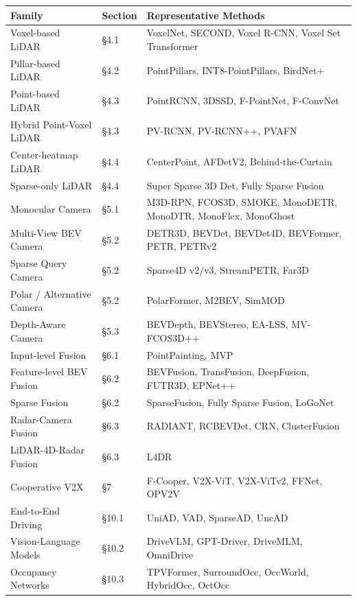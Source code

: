 {\def\LTcaptype{none} %
\begin{longtable}[]{@{}
  >{\raggedright\arraybackslash}p{}
  >{\raggedright\arraybackslash}p{}
  >{\raggedright\arraybackslash}p{}@{}}
\toprule\noalign{}
\begin{minipage}[b]{\linewidth}\raggedright
Family
\end{minipage} & \begin{minipage}[b]{\linewidth}\raggedright
Section
\end{minipage} & \begin{minipage}[b]{\linewidth}\raggedright
Representative Methods
\end{minipage} \\
\midrule\noalign{}
\endhead
\bottomrule\noalign{}
\endlastfoot
Voxel-based LiDAR & §4.1 & VoxelNet, SECOND, Voxel R-CNN, Voxel Set Transformer \\
Pillar-based LiDAR & §4.2 & PointPillars, INT8-PointPillars, BirdNet+ \\
Point-based LiDAR & §4.3 & PointRCNN, 3DSSD, F-PointNet, F-ConvNet \\
Hybrid Point-Voxel LiDAR & §4.3 & PV-RCNN, PV-RCNN++, PVAFN \\
Center-heatmap LiDAR & §4.4 & CenterPoint, AFDetV2, Behind-the-Curtain \\
Sparse-only LiDAR & §4.4 & Super Sparse 3D Det, Fully Sparse Fusion \\
Monocular Camera & §5.1 & M3D-RPN, FCOS3D, SMOKE, MonoDETR, MonoDTR, MonoFlex, MonoGhost \\
Multi-View BEV Camera & §5.2 & DETR3D, BEVDet, BEVDet4D, BEVFormer, PETR, PETRv2 \\
Sparse Query Camera & §5.2 & Sparse4D v2/v3, StreamPETR, Far3D \\
Polar / Alternative Camera & §5.2 & PolarFormer, M2BEV, SimMOD \\
Depth-Aware Camera & §5.3 & BEVDepth, BEVStereo, EA-LSS, MV-FCOS3D++ \\
Input-level Fusion & §6.1 & PointPainting, MVP \\
Feature-level BEV Fusion & §6.2 & BEVFusion, TransFusion, DeepFusion, FUTR3D, EPNet++ \\
Sparse Fusion & §6.2 & SparseFusion, Fully Sparse Fusion, LoGoNet \\
Radar-Camera Fusion & §6.3 & RADIANT, RCBEVDet, CRN, ClusterFusion \\
LiDAR-4D-Radar Fusion & §6.3 & L4DR \\
Cooperative V2X & §7 & F-Cooper, V2X-ViT, V2X-ViTv2, FFNet, OPV2V \\
End-to-End Driving & §10.1 & UniAD, VAD, SparseAD, UncAD \\
Vision-Language Models & §10.2 & DriveVLM, GPT-Driver, DriveMLM, OmniDrive \\
Occupancy Networks & §10.3 & TPVFormer, SurroundOcc, OccWorld, HybridOcc, OctOcc \\
\end{longtable}
}

